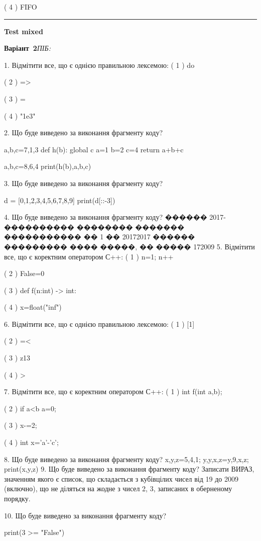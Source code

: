 \documentclass[11pt]{article}
\begin{document}
( 4 ) FIFO











\vspace{10mm}
\noindent\rule{\textwidth}{0.3pt}
\vspace{8mm}
{\large\textbf{Test mixed}}

\textbf{Варіант \No\,2}\hfill \textit{ПІБ:}\,\underline{\hspace{60mm}}
\vspace{4mm}

1. Відмітити все, що є однією правильною лексемою:
( 1 ) do

( 2 ) =>

( 3 ) =

( 4 ) "1e3"

2. Що буде виведено за виконання фрагменту коду?

a,b,c=7,1,3
def h(b):
global c    a=1
    b=2
    c=4
    return a+b+c

a,b,c=8,6,4
print(h(b),a,b,c)

3. Що буде виведено за виконання фрагменту коду?

d = [0,1,2,3,4,5,6,7,8,9]
print(d[::-3])


4. Що буде виведено за виконання фрагменту коду?
������ 2017-���������� �������� ������� ����������� �� 1 �� 20172017 ������ ��������� ���� �����, �� ����� 172009
5. Відмітити все, що є коректним оператором С++:
( 1 ) n=1; n++

( 2 ) False=0

( 3 ) def f(n:int) -> int:

( 4 ) x=float("inf")

6. Відмітити все, що є однією правильною лексемою:
( 1 ) [1]

( 2 ) =<

( 3 ) z13

( 4 ) >

7. Відмітити все, що є коректним оператором С++:
( 1 ) int f(int a,b);

( 2 ) if a<b a=0;

( 3 ) x-=2;

( 4 ) int x='a'-'c';

8. Що буде виведено за виконання фрагменту коду?
x,y,z=5,4,1;  y,y,x,z=y,9,x,z;  print(x,y,z)
9. Що буде виведено за виконання фрагменту коду?
Записати ВИРАЗ, значенням якого є список, що складається з кубівцілих чисел від 19 до 2009 (включно), що не діляться на жодне з чисел 2, 3, записаних в обернено\-му порядку.

10. Що буде виведено за виконання фрагменту коду?

print(3 >= "False")











\newpage
\end{document}
